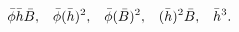 \begin{equation*}
\bar{\phi}\bar{h}\bar{B},\;\;\;\bar{\phi}(\bar{h})^{2},\;\;\;\bar{\phi}(\bar{%
B})^{2},\;\;\;(\bar{h})^{2}\bar{B},\;\;\;\bar{h}^{3}.
\end{equation*}

